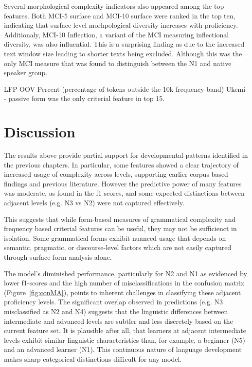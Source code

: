 Several morphological complexity indicators also appeared among the top features. Both MCI-5 surface and MCI-10
surface were ranked in the top ten, indicating that surface-level morhpological diversity increases with
proficiency. Additionaly, MCI-10 Inflection, a variant of the MCI measuring inflectional diversity, was also
influential. This is a surprising finding as due to the increased text window size leading to shorter texts being
 excluded. Although this was the only MCI measure that was found to distinguish between the N1 and native speaker
group.

LFP OOV Percent (percentage of tokens outside the 10k frequency band)
Ukemi - passive form was the only criterial feature in top 15.


\section{Discussion}

The results above provide partial support for developmental patterns identified in the previous chapters. In
particular, some features showed a clear trajectory of increased usage of complexity across levels, supporting
earlier corpus based findings and previous literature. However the predictive power of many features was moderate,
as found in the f1 scores, and some expected distinctions between adjacent levels (e.g. N3 vs N2) were not captured
effectively.

This suggests that while form-based measures of grammatical complexity and frequency based criterial features can be
useful, they may not be sufficienct in isolation. Some grammatical forms exhibit nuanced usage that depends on
semantic, pragmatic, or discourse-level factors which are not easily captured through surface-form
analysis alone.

The model's diminished performance, particularly for N2 and N1 as evidenced by lower f1-scores and the high number
of misclassifications in the confusion matrix (Figure~\ref{fig:conMA}), points to inherent challenges in
classifying these adjacent proficiency levels. The significant overlap observed in predictions (e.g. N3 misclassified
as N2 and N4) suggests that the linguistic differences between intermediate and advanced levels are subtler and less
discretely based on the current feature set. It is plausible after all, that learners at adjacent intermediate
levels exhibit similar linguistic characteristics than, for example, a beginner (N5) and an advanced learner (N1).
This continuous nature of language development makes sharp categorical distinctions difficult for any model.

